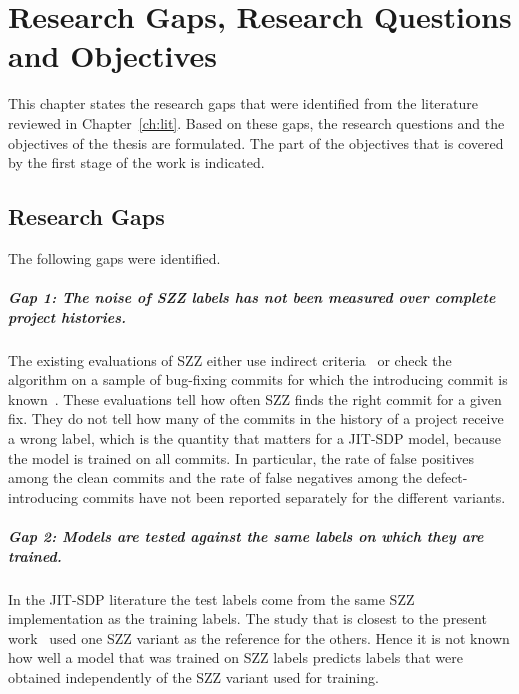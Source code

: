 \documentclass[12pt,a4paper,oneside]{report}
\begin{document}
\chapter{Research Gaps, Research Questions and Objectives}\label{ch:gaps}

This chapter states the research gaps that were identified from the
literature reviewed in Chapter~\ref{ch:lit}. Based on these gaps, the research
questions and the objectives of the thesis are formulated. The part of the
objectives that is covered by the first stage of the work is indicated.

\section{Research Gaps}

The following gaps were identified.

\paragraph{Gap 1: The noise of SZZ labels has not been measured over complete
project histories.} The existing evaluations of SZZ either use indirect
criteria~\cite{dacosta2017maszz} or check the algorithm on a sample of
bug-fixing commits for which the introducing commit is
known~\cite{rosa2021oracle,rodriguez2020bugs}. These evaluations tell how
often SZZ finds the right commit for a given fix. They do not tell how many
of the commits in the history of a project receive a wrong label, which is
the quantity that matters for a JIT-SDP model, because the model is trained on
all commits. In particular, the rate of false positives among the clean
commits and the rate of false negatives among the defect-introducing commits
have not been reported separately for the different variants.

\paragraph{Gap 2: Models are tested against the same labels on which they are
trained.} In the JIT-SDP literature the test labels come from the same SZZ
implementation as the training labels. The study that is closest to the
present work~\cite{fan2021mislabeled} used one SZZ variant as the reference
for the others. Hence it is not known how well a model that was trained on
SZZ labels predicts labels that were obtained independently of the SZZ
variant used for training.
\end{document}
